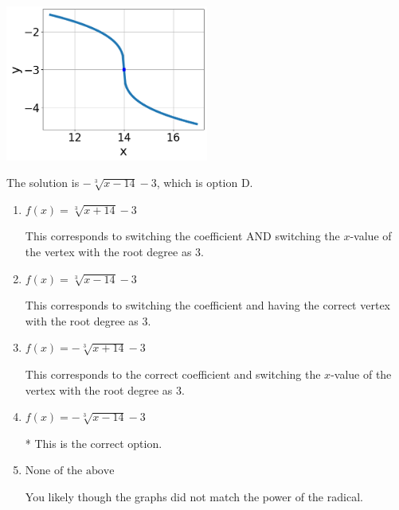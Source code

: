 \documentclass{extbook}[14pt]
\begin{document}
\begin{enumerate}
{\begin{center}
    \includegraphics[width=0.5\textwidth]{../Figures/radicalGraphToEquationCopyB.png}
\end{center}


The solution is \( - \sqrt[3]{x - 14} - 3 \), which is option D.\begin{enumerate}[label=\Alph*.]
\item \( f(x) = \sqrt[3]{x + 14} - 3 \)

This corresponds to switching the coefficient AND switching the $x$-value of the vertex with the root degree as $3$.
\item \( f(x) = \sqrt[3]{x - 14} - 3 \)

This corresponds to switching the coefficient and having the correct vertex with the root degree as $3$.
\item \( f(x) = - \sqrt[3]{x + 14} - 3 \)

This corresponds to the correct coefficient and switching the $x$-value of the vertex with the root degree as $3$.
\item \( f(x) = - \sqrt[3]{x - 14} - 3 \)

* This is the correct option.
\item \( \text{None of the above} \)

You likely though the graphs did not match the power of the radical.
\end{enumerate}

}
\end{enumerate}
\end{document}
